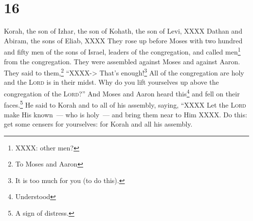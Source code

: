 \section{16}\label{Numbers 16}
\begin{enumerate}[align=center]
     Korah, the son of Izhar, the son of Kohath, the son of Levi, XXXX Dathan and Abiram, the sons of Eliab, XXXX%
     They rose up before Moses with two hundred and fifty men of the sons of Israel, leaders of the congregation, and called men\footnote{XXXX: other men?} from the congregation.%
     They were assembled against Moses and against Aaron. They said to them,\footnote{To Moses and Aaron} ``XXXX-> That's enough!\footnote{It is too much for you (to do this).} All of the congregation are holy and the \textsc{Lord} is in their midst. Why do you lift yourselves up above the congregation of the \textsc{Lord}?''%
     And Moses and Aaron heard this\footnote{Understood} and fell on their faces.\footnote{A sign of distress.}%
     He said to Korah and to all of his assembly, saying, ``XXXX Let the \textsc{Lord} make His known~--- who is holy~--- and bring them near to Him XXXX.%
     Do this: get some censers for yourselves: for Korah and all his assembly.%
\end{enumerate}
